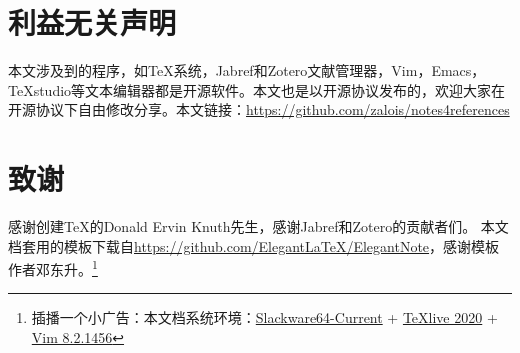 \documentclass[cn,hazy,blue,14pt,geye,normal,]{elegantnote}
\begin{document}
\section{利益无关声明}
本文涉及到的程序，如\TeX 系统，Jabref和Zotero文献管理器，Vim，Emacs，\TeX studio等文本编辑器都是开源软件。本文也是以开源协议发布的，欢迎大家在开源协议下自由修改分享。本文链接：\url{https://github.com/zalois/notes4references}
\section{致谢}
感谢创建\TeX 的Donald Ervin Knuth先生，感谢Jabref和Zotero的贡献者们。
本文档套用的模板下载自\href{https://github.com/ElegantLaTeX/ElegantNote}{https://github.com/Elegant\LaTeX/ElegantNote}，感谢模板作者邓东升。\footnote{插播一个小广告：本文档系统环境：\href{https://mirrors.slackware.com/slackware/slackware64-current/}{Slackware64-Current} + \href{https://www.tug.org/texlive/}{\TeX live 2020} + \href{https://www.vim.org/}{Vim 8.2.1456}}
\printbibliography[heading=bibintoc,title=参考文献]
%
%
\end{document}
